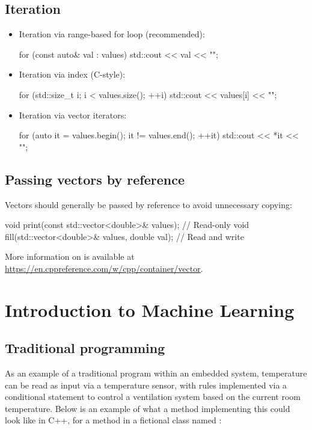 \subsection{Iteration}
\begin{itemize}
  \item Iteration via range-based for loop (recommended):
\begin{cppcode}
for (const auto& val : values)
{
    std::cout << val << "\n";
}
\end{cppcode}
  \item Iteration via index (C-style):
\begin{cppcode}
for (std::size_t i{}; i < values.size(); ++i)
{
    std::cout << values[i] << "\n";
}
\end{cppcode}
  \item Iteration via vector iterators:
\begin{cppcode}
for (auto it = values.begin(); it != values.end(); ++it)
{
    std::cout << *it << "\n";
}
\end{cppcode}
\end{itemize}

\subsection{Passing vectors by reference}
Vectors should generally be passed by reference to avoid unnecessary copying:

\begin{cppcode}
void print(const std::vector<double>& values);      // Read-only
void fill(std::vector<double>& values, double val); // Read and write
\end{cppcode}

\noindent More information on  is available at
\url{https://en.cppreference.com/w/cpp/container/vector}.

\section{Introduction to Machine Learning}
\label{c1:sec:intro}

\subsection{Traditional programming}
As an example of a traditional program within an embedded system, temperature can be read as input
via a temperature sensor, with rules implemented via a conditional statement to control a
ventilation system based on the current room temperature. Below is an example of what a method
implementing this could look like in C++, for a method  in a fictional class
named :

